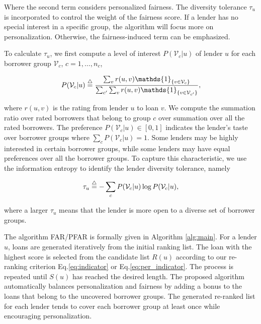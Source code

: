 Where the second term considers personalized fairness. The diversity tolerance $\tau_u$ is incorporated to control the weight of the fairness score. If a lender has no special interest in a specific group, the algorithm will focus more on personalization. Otherwise, the fairness-induced term can be emphasized.


To calculate $\tau_u$, we first compute a level of interest $P(\mathcal V_c|u)$ of lender $u$ for each borrower group $\mathcal V_c$, $c=1,\ldots,n_c$,

\begin{equation}
P(\mathcal V_c|u)\buildrel\triangle\over=\frac{\sum_vr(u,v)\mathds{1}_{\{v\in \mathcal V_c\}}}{\sum_{c'}\sum_vr(u,v)\mathds{1}_{\{v\in \mathcal V_{c'}\}}},
\end{equation}
\vspace{0.25cm}

where $r(u,v)$ is the rating from lender $u$ to loan $v$. We compute the summation ratio over rated borrowers that belong to group $c$ over summation over all the rated borrowers. The preference $P(\mathcal V_c|u)\in [0,1]$ indicates the lender's taste over borrower groups where $\sum_{c} P(\mathcal V_c|u)=1$. Some lenders may be highly interested in certain borrower groups, while some lenders may have equal preferences over all the borrower groups. To capture this characteristic, we use the information entropy \cite{shannon2001mathematical} to identify the lender diversity tolerance, namely

\begin{equation}
\tau_u\buildrel\triangle\over=-\sum_{c}P(\mathcal V_c|u)\log P(\mathcal V_c|u),
\end{equation}
\vspace{0.25cm}

where a larger $\tau_u$ means that the lender is more open to a diverse set of borrower groups.

The algorithm FAR/PFAR is formally given in Algorithm \ref{alg:main}. For a lender $u$, loans are generated iteratively from the initial ranking list. The loan with the highest score is selected from the candidate list $R(u)$ according to our re-ranking criterion Eq.\eqref{eq:indicator} or Eq.\eqref{eq:per_indicator}. The process is repeated until $S(u)$ has reached the desired length. The proposed algorithm automatically balances personalization and fairness by adding a bonus to the loans that belong to the uncovered borrower groups. The generated re-ranked list for each lender tends to cover each borrower group at least once while encouraging personalization.

